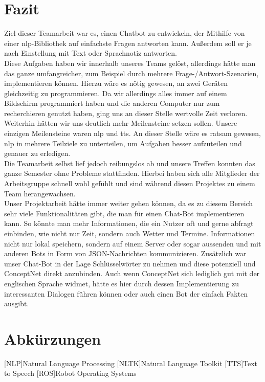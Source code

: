 \documentclass[12pt]{article}
\begin{document}
\section{Fazit}
Ziel dieser Teamarbeit war es,  einen Chatbot zu entwickeln, der Mithilfe von einer \ac{nlp}-Bibliothek auf einfachste Fragen antworten kann. Außerdem soll er je nach Einstellung mit Text oder Sprachnotiz antworten.\\
Diese Aufgaben haben wir innerhalb unseres Teams gelöst, allerdings hätte man das ganze umfangreicher, zum Beispiel durch mehrere Frage-/Antwort-Szenarien, implementieren können. Hierzu wäre es nötig gewesen, an zwei Geräten gleichzeitig zu programmieren. Da wir allerdings alles immer auf einem Bildschirm programmiert haben und die anderen Computer nur zum recherchieren genutzt haben, ging uns an dieser Stelle wertvolle Zeit verloren.\\
Weiterhin hätten wir uns deutlich mehr Meilensteine setzen sollen. Unsere einzigen Meilensteine waren \ac{nlp} und \ac{tts}. An dieser Stelle wäre es ratsam gewesen, \ac{nlp} in mehrere Teilziele zu unterteilen, um Aufgaben besser aufzuteilen und genauer zu erledigen.\\
Die Teamarbeit selbst lief jedoch reibungslos ab und unsere Treffen konnten das ganze Semester ohne Probleme stattfinden. Hierbei haben sich alle Mitglieder der Arbeitsgruppe schnell wohl gefühlt und sind während diesen Projektes zu einem Team herangewachsen.\\
Unser Projektarbeit hätte immer weiter gehen können, da es zu diesem Bereich sehr viele Funktionalitäten gibt, die man für einen Chat-Bot implementieren kann. So könnte man mehr Informationen, die ein Nutzer oft und gerne abfragt einbinden, wie nicht nur Zeit, sondern auch Wetter und Termine. Informationen nicht nur lokal speichern, sondern auf einem Server oder sogar aussenden und mit anderen Bots in Form von JSON-Nachrichten kommunizieren.
Zusätzlich war unser Chat-Bot in der Lage Schlüsselwörter zu nehmen und diese potenziell und ConceptNet direkt anzubinden. Auch wenn ConceptNet sich lediglich gut mit der englischen Sprache widmet, hätte es hier durch dessen Implementierung zu interessanten Dialogen führen können oder auch einen Bot der einfach Fakten ausgibt.

\clearpage
\section{Abkürzungen}
\begin{acronym} 
[NLP]{Natural Language Processing} 
[NLTK]{Natural Language Toolkit}
[TTS]{Text to Speech}
[ROS]{Robot Operating Systems}
\end{acronym}
\end{document}
